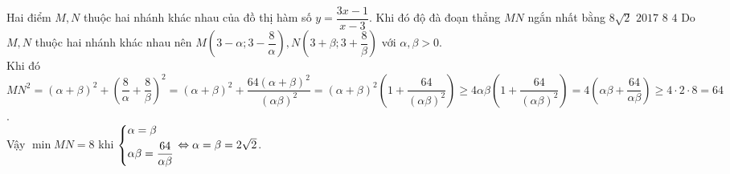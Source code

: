 \begin{ex}%
Hai điểm $M, N$ thuộc hai nhánh khác nhau của đồ thị hàm số $y=\dfrac{3x-1}{x-3}$. Khi đó độ đà đoạn thẳng $MN$ ngắn nhất bằng
\choice
{$8\sqrt{2}$}
{$2017$}
{\True $8$}
{$4$}
\loigiai
{
Do $M, N$ thuộc hai nhánh khác nhau nên $M\left(3-\alpha;3-\dfrac{8}{\alpha}\right), N\left(3+\beta; 3+\dfrac{8}{\beta}\right)$ với $\alpha, \beta>0$.\\Khi đó $MN^2=(\alpha+\beta)^2+\left(\dfrac{8}{\alpha}+\dfrac{8}{\beta}\right)^2=(\alpha+\beta)^2+\dfrac{64(\alpha+\beta)^2}{(\alpha\beta)^2}=(\alpha+\beta)^2\left(1+\dfrac{64}{(\alpha\beta)^2}\right)\geq 4\alpha\beta\left(1+\dfrac{64}{(\alpha\beta)^2}\right)=4\left(\alpha\beta+\dfrac{64}{\alpha\beta}\right)\geq 4\cdot 2\cdot 8=64$.\\
Vậy $\min MN=8$ khi $\left\{\begin{aligned}&\alpha=\beta\\&\alpha\beta=\dfrac{64}{\alpha\beta}\end{aligned}\right.\Leftrightarrow \alpha=\beta=2\sqrt{2}$.
}
\end{ex}

